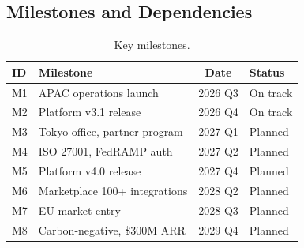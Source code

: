\documentclass[
    language=english,
    doctype=strategic-plan,
    institution=none,
]{../../omnilatex}
\begin{document}
\subsection{Milestones and Dependencies}
\begin{table}[htbp]
\centering\small
\begin{tabular}{llcl}
    \toprule
    \textbf{ID} & \textbf{Milestone} & \textbf{Date} & \textbf{Status} \\
    \midrule
    M1  & APAC operations launch       & 2026 Q3 & On track \\
    M2  & Platform v3.1 release         & 2026 Q4 & On track \\
    M3  & Tokyo office, partner program & 2027 Q1 & Planned  \\
    M4  & ISO 27001, FedRAMP auth       & 2027 Q2 & Planned  \\
    M5  & Platform v4.0 release         & 2027 Q4 & Planned  \\
    M6  & Marketplace 100+ integrations & 2028 Q2 & Planned  \\
    M7  & EU market entry               & 2028 Q3 & Planned  \\
    M8  & Carbon-negative, \$300M ARR   & 2029 Q4 & Planned  \\
    \bottomrule
\end{tabular}
\caption{Key milestones.}
\end{table}
\end{document}
